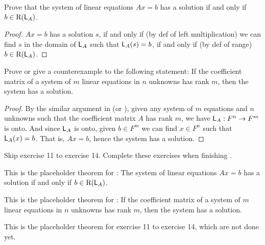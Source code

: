 \begin{exercise} \label{exercise 3.3.9}
Prove that the system of linear equations \(Ax = b\) has a solution if and only if \(b \in \mathrm{R}(\textsf{L}_A)\).
\end{exercise}

\begin{proof}
\(Ax = b\) has a solution \(s\), if and only if (by def of left multiplication) we can find \(s\) in the domain of \(\textsf{L}_A\) such that \(\textsf{L}_A(s) = b\), if and only if (by def of range) \(b \in \mathrm{R}(\textsf{L}_A)\).
\end{proof}

\begin{exercise} \label{exercise 3.3.10}
Prove or give a counterexample to the following statement:
If the coefficient matrix of a system of \(m\) linear equations in \(n\) unknowns has rank \(m\), then the system has a solution.
\end{exercise}

\begin{proof}
By the similar argument in (or ), given any system of \(m\) equations and \(n\) unknowns such that the coefficient matrix \(A\) has rank \(m\), we have \(\textsf{L}_A : F^n \to F^m\) is onto.
And since \(\textsf{L}_A\) is onto, given \(b \in F^m\) we can find \(x \in F^n\) such that \(\textsf{L}_A(x) = b\).
That is, \(Ax = b\), hence the system has a solution.
\end{proof}

\TODOREF{} Skip exercise 11 to exercise 14.
Complete these exercises when finishing .

\begin{additional theorem} \label{athm 3.12}
This is the placeholder theorem for : The system of linear equations \(Ax = b\) has a solution if and only if \(b \in \mathrm{R}(\textsf{L}_A)\).
\end{additional theorem}

\begin{additional theorem} \label{athm 3.13}
This is the placeholder theorem for :
If the coefficient matrix of a system of \(m\) linear equations in \(n\) unknowns has rank \(m\), then the system has a solution.
\end{additional theorem}

\begin{additional theorem} \label{athm 3.14}
This is the placeholder theorem for exercise 11 to exercise 14, which are not done yet.
\end{additional theorem}
